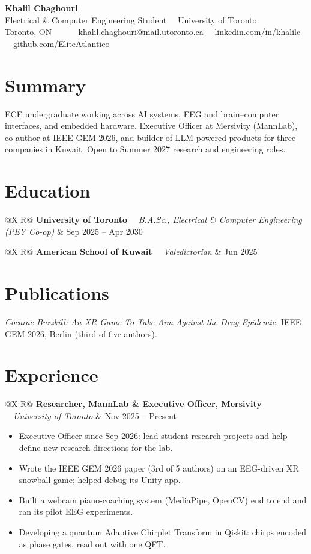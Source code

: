 \documentclass[letterpaper,10pt]{article}
\makeatletter
\newcommand{\entry}[3]{%
  \begin{tabularx}{\textwidth}{@{}X R@{}}
    \textbf{#1} \ \textbar\ \textit{#2} & #3 \\
  \end{tabularx}\par\vspace{-1pt}%
}
\newcommand{\bullets}[1]{%
  \begin{itemize}[leftmargin=1.4em,topsep=0pt,itemsep=0pt,parsep=0pt]
    #1
  \end{itemize}%
}
\makeatother
\begin{document}
\begin{center}
  {\Huge\bfseries\color{accent} Khalil Chaghouri}\\[3pt]
  {\large Electrical \& Computer Engineering Student \ \textbar\ University of Toronto}\\[4pt]
  {\small Toronto, ON \ \textbar\ \ifdefined\resumephone \resumephone\ \ \textbar\ \fi
  \href{mailto:khalil.chaghouri@mail.utoronto.ca}{khalil.chaghouri@mail.utoronto.ca} \ \textbar\
  \href{https://www.linkedin.com/in/khalilc}{linkedin.com/in/khalilc} \ \textbar\
  \href{https://github.com/EliteAtlantico}{github.com/EliteAtlantico}}
\end{center}

\section{Summary}
ECE undergraduate working across AI systems, EEG and brain--computer interfaces, and embedded hardware.
Executive Officer at Mersivity (MannLab), co-author at IEEE GEM 2026, and builder of LLM-powered products
for three companies in Kuwait. Open to Summer 2027 research and engineering roles.

\section{Education}
\entry{University of Toronto}{B.A.Sc., Electrical \& Computer Engineering (PEY Co-op)}{Sep 2025 -- Apr 2030}
\entry{American School of Kuwait}{Valedictorian}{Jun 2025}

\section{Publications}
\textit{Cocaine Buzzkill: An XR Game To Take Aim Against the Drug Epidemic}. IEEE GEM 2026, Berlin (third of five authors).

\section{Experience}

\entry{Researcher, MannLab \& Executive Officer, Mersivity}{University of Toronto}{Nov 2025 -- Present}
\bullets{
  \item Executive Officer since Sep 2026: lead student research projects and help define new research directions for the lab.
  \item Wrote the IEEE GEM 2026 paper (3rd of 5 authors) on an EEG-driven XR snowball game; helped debug its Unity app.
  \item Built a webcam piano-coaching system (MediaPipe, OpenCV) end to end and ran its pilot EEG experiments.
  \item Developing a quantum Adaptive Chirplet Transform in Qiskit: chirps encoded as phase gates, read out with one QFT.
}
\end{document}
